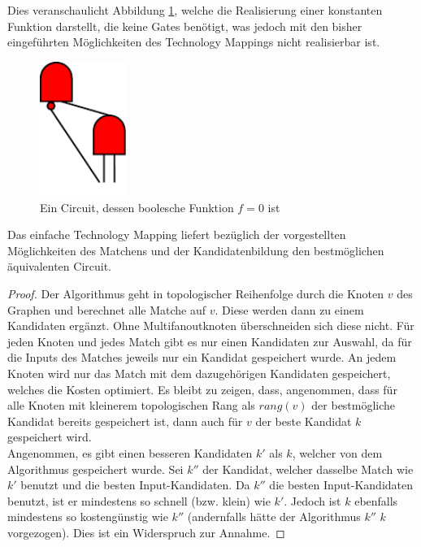 \documentclass[11pt, a4paper, german]{article}
\newcommand{\TM}{Technology  Mapping }
\begin{document}
Dies veranschaulicht Abbildung \ref{bild:compl_redundant}, welche die Realisierung einer konstanten Funktion darstellt, die keine Gates benötigt, was jedoch mit den bisher eingeführten  Möglichkeiten des Technology Mappings nicht realisierbar ist.
\begin{figure}
		\includegraphics[width = 2.8cm]{pictures/compiled/compl_redundant}
		\caption{Ein Circuit, dessen boolesche Funktion $f = 0 $ ist}
		\label{bild:compl_redundant}
\end{figure}
\begin{cor}
	Das einfache \TM  liefert bezüglich der vorgestellten Möglichkeiten des Matchens und der Kandidatenbildung den bestmöglichen äquivalenten Circuit.
\end{cor}
\begin{proof} 
	Der Algorithmus geht in topologischer Reihenfolge durch die Knoten $v$ des Graphen und berechnet alle Matche auf $v$. Diese werden dann zu einem Kandidaten ergänzt. 
 Ohne Multifanoutknoten überschneiden sich diese nicht. Für jeden Knoten und jedes Match gibt es nur einen Kandidaten zur Auswahl, da für die Inputs des Matches jeweils nur ein Kandidat gespeichert wurde. An jedem Knoten wird nur das Match mit dem dazugehörigen Kandidaten gespeichert, welches die Kosten optimiert. 
 Es bleibt zu zeigen, dass, angenommen, dass für alle Knoten mit kleinerem topologischen Rang als $rang(v)$ der bestmögliche Kandidat bereits gespeichert ist, dann auch für $v$ der beste Kandidat $k$ gespeichert wird. \\
 Angenommen, es gibt einen besseren Kandidaten $k'$ als $k$, welcher von dem Algorithmus gespeichert wurde. Sei $k''$ der Kandidat, welcher dasselbe Match wie $k'$ benutzt und die besten Input-Kandidaten. Da $k''$ die besten Input-Kandidaten benutzt, ist er mindestens so schnell (bzw. klein) wie $k'$. Jedoch ist $k$ ebenfalls mindestens so kostengünstig wie $k''$ (andernfalls hätte der Algorithmus $k''$ $k$ vorgezogen). Dies ist ein Widerspruch zur Annahme. 
\end{proof}
 
\end{document}
